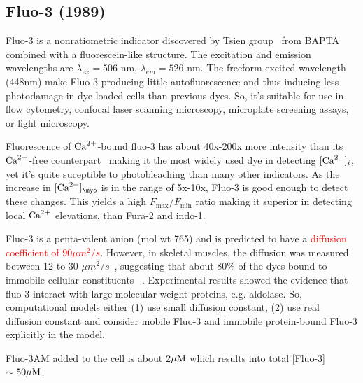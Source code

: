 \subsection{Fluo-3 (1989)}
\label{sec:fluo-3}

Fluo-3 is a nonratiometric indicator discovered by Tsien
group~\citep{minta1989,kao1989} from BAPTA combined with a fluorescein-like
structure. The excitation and emission wavelengths are $\lambda_{ex}=506$ nm,
$\lambda_{em}=526$ nm.
The freeform excited wavelength (448nm) make Fluo-3 producing little
autofluorescence and thus inducing less photodamage in dye-loaded cells than
previous dyes. So, it's suitable for use in flow cytometry, confocal laser
scanning microscopy, microplate screening assays, or light microscopy.


Fluorescence of ${\text{Ca}^{2+}}$-bound fluo-3 has about 40x-200x more intensity than its
${\text{Ca}^{2+}}$-free counterpart~\citep{harkins1993} making it the most widely used dye in
detecting $[{\text{Ca}^{2+}}]_i$, yet it's quite suceptible to photobleaching than many other
indicators.
As the increase in $[\Ca]_\myo$ is in the range of 5x-10x, Fluo-3 is good enough
to detect these changes.
This yields a high $F_\max/F_\min$ ratio making it superior in detecting local
${\text{Ca}^{2+}}$ elevations, than Fura-2 and indo-1.



Fluo-3 is a penta-valent anion (mol wt 765) and is predicted to have a
\textcolor{red}{ diffusion coefficient of $90\mu m^2/s$}.
However, in skeletal muscles, the diffusion was measured between 12 to 30 $\mu
m^2/s$~\citep{harkins1993}, suggesting that about 80\% of the dyes  bound to
immobile cellular constituents ~\citep{smith1998}. Experimental results showed
the evidence that fluo-3 interact with large molecular weight proteins, e.g.
aldolase. So, computational models either (1) use small diffusion constant, (2)
use real diffusion constant and consider mobile Fluo-3 and immobile
protein-bound Fluo-3 explicitly in the model.

Fluo-3AM added to the cell is about 2${\mu\text{M}}$ \citep{williams1990qic} which
results into total [Fluo-3] $\sim 50{\mu\text{M}}$.

